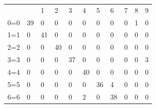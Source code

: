 \documentclass[times, utf8, diplomski]{fer}
\theoremstyle{definition}
\begin{document}
\begin{table}[h]
\centering
\begin{tabular}{lllllllllll}
& \cellcolor[HTML]{FFFFFF}{\color[HTML]{333333} 0} & 1 & 2 & 3 & 4 & 5 & 6 & 7 & 8 & 9 \\ \cline{2-11}
\multicolumn{1}{l|}{0=0} & \multicolumn{1}{l|}{\cellcolor[HTML]{FFCB2F}39} & \multicolumn{1}{l|}{0} & \multicolumn{1}{l|}{0} & \multicolumn{1}{l|}{0} & \multicolumn{1}{l|}{0} & \multicolumn{1}{l|}{0} & \multicolumn{1}{l|}{0} & \multicolumn{1}{l|}{0} & \multicolumn{1}{l|}{1} & \multicolumn{1}{l|}{0} \\ \cline{2-11}
\multicolumn{1}{l|}{1=1} & \multicolumn{1}{l|}{0} & \multicolumn{1}{l|}{\cellcolor[HTML]{FFCB2F}41} & \multicolumn{1}{l|}{0} & \multicolumn{1}{l|}{0} & \multicolumn{1}{l|}{0} & \multicolumn{1}{l|}{0} & \multicolumn{1}{l|}{0} & \multicolumn{1}{l|}{0} & \multicolumn{1}{l|}{0} & \multicolumn{1}{l|}{0} \\ \cline{2-11}
\multicolumn{1}{l|}{2=2} & \multicolumn{1}{l|}{0} & \multicolumn{1}{l|}{0} & \multicolumn{1}{l|}{\cellcolor[HTML]{FFCB2F}40} & \multicolumn{1}{l|}{0} & \multicolumn{1}{l|}{0} & \multicolumn{1}{l|}{0} & \multicolumn{1}{l|}{0} & \multicolumn{1}{l|}{0} & \multicolumn{1}{l|}{0} & \multicolumn{1}{l|}{0} \\ \cline{2-11}
\multicolumn{1}{l|}{3=3} & \multicolumn{1}{l|}{0} & \multicolumn{1}{l|}{0} & \multicolumn{1}{l|}{0} & \multicolumn{1}{l|}{\cellcolor[HTML]{FFCB2F}37} & \multicolumn{1}{l|}{0} & \multicolumn{1}{l|}{0} & \multicolumn{1}{l|}{0} & \multicolumn{1}{l|}{0} & \multicolumn{1}{l|}{0} & \multicolumn{1}{l|}{3} \\ \cline{2-11}
\multicolumn{1}{l|}{4=4} & \multicolumn{1}{l|}{0} & \multicolumn{1}{l|}{0} & \multicolumn{1}{l|}{0} & \multicolumn{1}{l|}{0} & \multicolumn{1}{l|}{\cellcolor[HTML]{FFCB2F}40} & \multicolumn{1}{l|}{0} & \multicolumn{1}{l|}{0} & \multicolumn{1}{l|}{0} & \multicolumn{1}{l|}{0} & \multicolumn{1}{l|}{0} \\ \cline{2-11}
\multicolumn{1}{l|}{5=5} & \multicolumn{1}{l|}{0} & \multicolumn{1}{l|}{0} & \multicolumn{1}{l|}{0} & \multicolumn{1}{l|}{0} & \multicolumn{1}{l|}{0} & \multicolumn{1}{l|}{\cellcolor[HTML]{FFCB2F}36} & \multicolumn{1}{l|}{4} & \multicolumn{1}{l|}{0} & \multicolumn{1}{l|}{0} & \multicolumn{1}{l|}{0} \\ \cline{2-11}
\multicolumn{1}{l|}{6=6} & \multicolumn{1}{l|}{0} & \multicolumn{1}{l|}{0} & \multicolumn{1}{l|}{0} & \multicolumn{1}{l|}{0} & \multicolumn{1}{l|}{2} & \multicolumn{1}{l|}{0} & \multicolumn{1}{l|}{\cellcolor[HTML]{FFCB2F}38} & \multicolumn{1}{l|}{0} & \multicolumn{1}{l|}{0} & \multicolumn{1}{l|}{0} \\ \cline{2-11}

\end{tabular}
\end{table}
\end{document}
